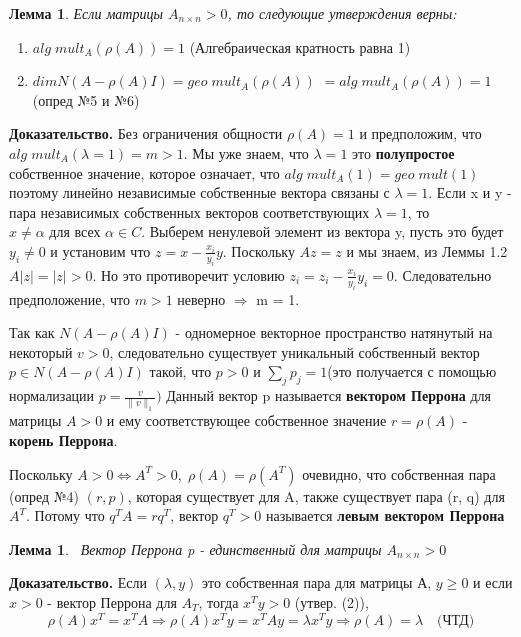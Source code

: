 \documentclass[a4paper,12pt,leqno]{article} %
\newtheorem{lemma}[theorem]{Лемма}
\begin{document}
\begin{lemma}
    \noindent Если матрицы $A_{n \times n} > 0$, 
    то следующие утверждения верны:
\end{lemma}
    \begin{enumerate}
        \item $alg \; mult_{A}(\rho(A)) = 1$ (Алгебраическая кратность равна 1)
        \item $dimN(A - \rho(A)I) = geo \; mult_{A}(\rho(A))$
        $ = alg \; mult_{A}(\rho(A)) = 1$ (опред №5 и №6)
    \end{enumerate}

\noindent\textbf{Доказательство.} 
    Без ограничения общности $\rho(A) = 1$ и 
    предположим, что $alg \; mult_{A} (\lambda = 1) = m > 1$.
    Мы уже знаем, что $\lambda = 1$ это \textbf{полупростое}
    собственное значение, которое означает, что $alg \; mult_{A}(1) = geo \; mult(1)$
    поэтому линейно независимые собственные вектора связаны с $\lambda = 1.$
    Если x и y - пара независимых собственных векторов соответствующих $\lambda = 1$,
    то $x \neq \alpha \text{ для всех } \alpha \in C$. Выберем ненулевой элемент из вектора y,
    пусть это будет $y_{i} \neq 0$ и установим что $z = x - \frac{x_i}{y_i}y.$ Поскольку $Az = z$  и мы знаем,
    из Леммы 1.2 $A|z| = |z| > 0.$ Но это противоречит условию
    $z_i = z_i - \frac{x_i}{y_i}y_i =0.$
    Следовательно предположение, что $m > 1$ неверно $\Rightarrow$ m = 1.

    Так как $N(A - \rho(A)I)$ - одномерное векторное пространство натянутый на некоторый
    $v > 0$, следовательно существует уникальный собственный вектор $p \in N(A - \rho(A)I)$
    такой, что $p > 0$ и $\sum_j p_j = 1 $(это получается с помощью нормализации $p = \frac{v}{\|v\|_1})$
    Данный вектор p называется \textbf{вектором Перрона} для матрицы $A > 0$ и ему соответствующее
    собственное значение $r = \rho(A)$ - \textbf{корень Перрона}.
    
    Поскольку $A > 0 \Leftrightarrow A^T > 0, \; \rho(A) = \rho(A^T)$ очевидно, что собственная пара (опред №4)
    $(r, p)$, которая существует для A, также существует пара (r, q) для $A^T$.
    Потому что $q^T A = r q^T$, вектор $q^T > 0$ называется \textbf{левым вектором Перрона}
    \begin{lemma}
     Вектор Перрона p - единственный для матрицы  $A_{n \times n} > 0$
    \end{lemma} 
    
    \noindent    \textbf{Доказательство.} 
    Если $(\lambda, y)$ это собственная пара для матрицы А, \newline
    $y \geq 0$ и если $ x > 0$ - вектор Перрона для $A_T$, тогда $x^Ty > 0$ (утвер.
    (2)), 
    \begin{equation*}
        \rho(A)x^T = x^TA \Rightarrow \rho(A)x^Ty = x^TAy = \lambda x^T y \Rightarrow \rho(A) = \lambda \quad \text{(ЧТД)}
    \end{equation*}
    
\end{document}
